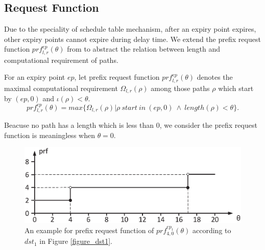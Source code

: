 \documentclass[sigconf]{acmart}
\begin{document}
\subsection{Request Function}\label{section_prf}
Due to the speciality of schedule table mechanism, after an expiry point expires, other expiry points cannot expire during delay time. We extend the prefix request function $prf^{ep}_{l,r}(\theta)$ from \cite{DBLP:journals/rts/Stigge015a}  to abstract the relation between length and computational requirement of paths.
\begin{definition}
For an expiry point $ep$, let prefix request function $prf^{ep}_{l,r}(\theta)$ denotes the maximal computational requirement $\Omega_{l,r}(\rho)$ among those paths $\rho$ which start by $(ep,0)$ and $\iota(\rho)<\theta$.
\begin{equation}
prf^{ep}_{l,r}(\theta)=max\{\Omega_{l,r}(\rho)|\rho \ start\ in\ (ep,0)\ \wedge\ length(\rho)<\theta\}.
\end{equation}\label{equation_prf}
\end{definition}

Beacuse no path has a length which is less than 0, we consider the prefix request function is meaningless when $\theta=0$.


\begin{figure}[t]
  \centering
  \includegraphics[scale=0.32]{graphics/figure_prf.eps}
  \caption{An example for prefix request function of $prf^{ep_1}_{4,0}(\theta)$ according to $dst_1$ in Figure \ref{figure_dst1}.} 
  \label{figure_prf}
\end{figure}
\end{document}
